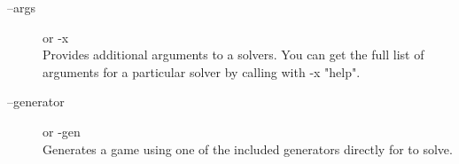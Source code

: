 \begin{description}
\item[{\ttfamily --args }] \enspace or
{\ttfamily -x }  \\
	Provides additional arguments to a solvers. You can get the full list of
	arguments for a particular solver by calling \pgsolver with {\ttfamily -x
	"help"}.

\item[{\ttfamily --generator  }]
\enspace or {\ttfamily -gen  }  \\
	Generates a game using one of the included generators directly for \pgsolver to
	solve.


% 
% 
% 
% 
% 
% 
% 
% 
% 
% 

\end{description}
